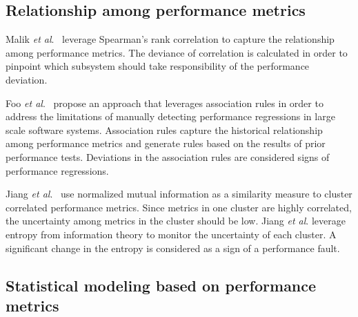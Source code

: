 \subsection{Relationship among performance metrics}
\label{sec:relatedrelation}

Malik \emph{et al$.$}~\cite{5635038} leverage Spearman's rank correlation to capture the relationship among performance metrics. The deviance of correlation is calculated in order to pinpoint which subsystem should take responsibility of the performance deviation.

Foo\emph{ et al$.$}~\cite{foo2010mining} propose an approach that leverages association rules in order to address the limitations of manually detecting performance regressions in large scale software systems. Association rules capture the historical relationship among performance metrics and generate rules based on the results of prior performance tests. Deviations in the association rules are considered signs of performance regressions.

Jiang \emph{et al$.$}~\cite{5270324} use normalized mutual information as a similarity measure to cluster correlated performance metrics. Since metrics in one cluster are highly correlated, the uncertainty among metrics in the cluster should be low. Jiang \emph{et al$.$} leverage entropy from information theory to monitor the uncertainty of each cluster. A significant change in the entropy is considered as a sign of a performance fault. %



\subsection{Statistical modeling based on performance metrics}
\label{sec:relatedmodel}

